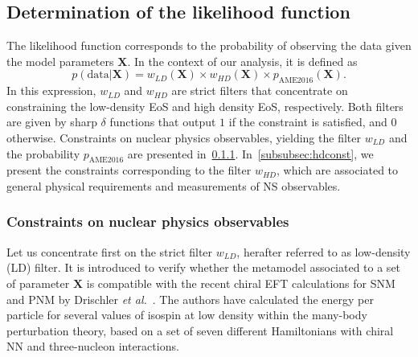 \subsection{Determination of the likelihood function}\label{subsec:likeli}

The likelihood function corresponds to the probability of observing the data
given the model parameters $\bm{X}$. In the context of our analysis, it is
defined as
%
\begin{equation}
  p(\text{data}|\bm{X}) = w_{LD}(\bm{X}) \times 
  w_{HD}(\bm{X}) \times p_{\text{AME2016}}(\bm{X}).
\end{equation}
%
In this expression, $w_{LD}$ and $w_{HD}$ are strict filters that concentrate
on constraining the low-density EoS and high density EoS, respectively. Both 
filters are given by sharp $\delta$ functions that output $1$ if the constraint 
is satisfied, and $0$ otherwise. 
Constraints on nuclear physics observables, yielding the filter $w_{LD}$ and 
the probability $p_{\text{AME2016}}$ are presented in~\ref{subsubsec:ldconst}.
In~\ref{subsubsec:hdconst}, we present the
constraints corresponding to the filter $w_{HD}$, which are associated to 
general physical requirements and measurements of NS observables. 

\subsubsection{Constraints on nuclear physics
observables}\label{subsubsec:ldconst}

Let us concentrate first on the strict filter $w_{LD}$, herafter referred to as
low-density (LD) filter. It is introduced to verify whether the metamodel 
associated to a set of parameter $\bm{X}$ is compatible with the recent chiral
EFT calculations for SNM and PNM by Drischler 
\textit{et al.}~\cite{Drischler2016}. The authors have calculated the energy
per particle for several values of isospin at low density within the many-body
perturbation theory, based on a set of seven different Hamiltonians with chiral 
NN and three-nucleon interactions.

